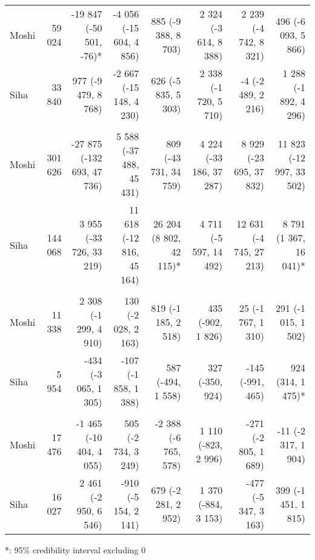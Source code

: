 \begin{table}[t]
\begin{tabular*}{\linewidth}{@{\extracolsep{\fill}}l|rrrrrrr}
\midrule\addlinespace[2.5pt]
\multicolumn{8}{l}{Diarrhea} \\[2.5pt] 
\midrule\addlinespace[2.5pt]
Moshi & 59 024 & -19 847 (-50 501, -76)* & -4 056 (-15 604, 4 856)  & 885 (-9 388, 8 703)  & 2 324 (-3 614, 8 388)  & 2 239 (-4 742, 8 321)  & 496 (-6 093, 5 866)  \\ 
Siha & 33 840 & 977 (-9 479, 8 768)  & -2 667 (-15 148, 4 230)  & 626 (-5 835, 5 303)  & 2 338 (-1 720, 5 710)  & -4 (-2 489, 2 216)  & 1 288 (-1 892, 4 296)  \\ 
\midrule\addlinespace[2.5pt]
\multicolumn{8}{l}{Urinary Tract Infections} \\[2.5pt] 
\midrule\addlinespace[2.5pt]
Moshi & 301 626 & -27 875 (-132 693, 47 736)  & 5 588 (-37 488, 45 431)  & 809 (-43 731, 34 759)  & 4 224 (-33 186, 37 287)  & 8 929 (-23 695, 37 832)  & 11 823 (-12 997, 33 502)  \\ 
Siha & 144 068 & 3 955 (-33 726, 33 219)  & 11 618 (-12 816, 45 164)  & 26 204 (8 802, 42 115)* & 4 711 (-5 597, 14 492)  & 12 631 (-4 745, 27 213)  & 8 791 (1 367, 16 041)* \\ 
\midrule\addlinespace[2.5pt]
\multicolumn{8}{l}{Malaria} \\[2.5pt] 
\midrule\addlinespace[2.5pt]
Moshi & 11 338 & 2 308 (-1 299, 4 910)  & 130 (-2 028, 2 163)  & 819 (-1 185, 2 518)  & 435 (-902, 1 826)  & 25 (-1 767, 1 310)  & 291 (-1 015, 1 502)  \\ 
Siha & 5 954 & -434 (-3 065, 1 305)  & -107 (-1 858, 1 388)  & 587 (-494, 1 558)  & 327 (-350, 924)  & -145 (-991, 465)  & 924 (314, 1 475)* \\ 
\midrule\addlinespace[2.5pt]
\multicolumn{8}{l}{Infectious Eye Disease} \\[2.5pt] 
\midrule\addlinespace[2.5pt]
Moshi & 17 476 & -1 465 (-10 404, 4 055)  & 505 (-2 734, 3 249)  & -2 388 (-6 765, 578)  & 1 110 (-823, 2 996)  & -271 (-2 805, 1 689)  & -11 (-2 317, 1 904)  \\ 
Siha & 16 027 & 2 461 (-2 950, 6 546)  & -910 (-5 154, 2 141)  & 679 (-2 281, 2 952)  & 1 370 (-884, 3 153)  & -477 (-5 347, 3 163)  & 399 (-1 451, 1 815)  \\ 
\bottomrule
\end{tabular*}
\begin{minipage}{\linewidth}
*: 95\% credibility interval excluding 0\\
\end{minipage}
\end{table}


